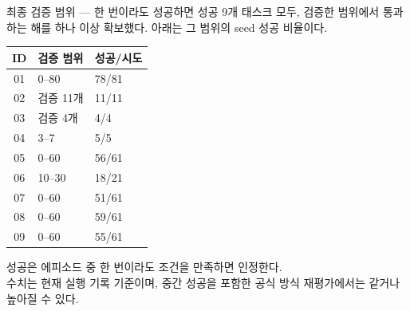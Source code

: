 \documentclass[aspectratio=169,10pt]{beamer}
\begin{document}
\begin{frame}{최종 검증 범위 — 한 번이라도 성공하면 성공}
  \small
  9개 태스크 모두, 검증한 범위에서 통과하는 해를 하나 이상 확보했다. 아래는 그 범위의 seed 성공 비율이다.

  \vspace{0.4em}
  \begin{tabular}{@{}cll@{}}
    \toprule
    ID & 검증 범위 & 성공/시도 \\
    \midrule
    01 & 0--80 & 78/81 \\
    02 & 검증 11개 & 11/11 \\
    03 & 검증 4개 & 4/4 \\
    04 & 3--7 & 5/5 \\
    05 & 0--60 & 56/61 \\
    06 & 10--30 & 18/21 \\
    07 & 0--60 & 51/61 \\
    08 & 0--60 & 59/61 \\
    09 & 0--60 & 55/61 \\
    \bottomrule
  \end{tabular}

  \vspace{0.4em}
  \footnotesize
  성공은 에피소드 중 한 번이라도 조건을 만족하면 인정한다.\\
  수치는 현재 실행 기록 기준이며, 중간 성공을 포함한 공식 방식 재평가에서는 같거나 높아질 수 있다.
\end{frame}
\end{document}
